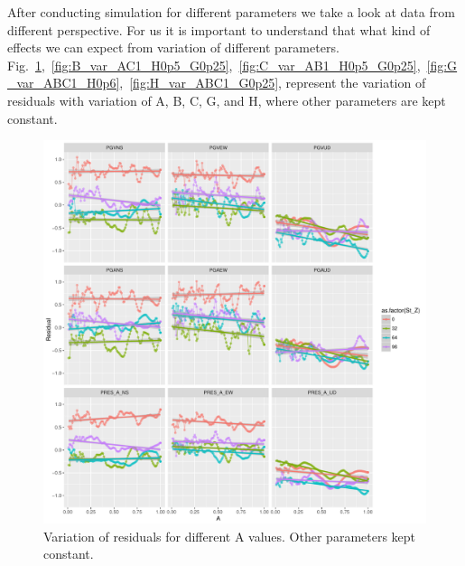 After conducting simulation for different parameters we take a look at data from different perspective. For us it is important to understand that what kind of effects we can expect from variation of different parameters. Fig.~\ref{fig:A_var_BC_1_H0p5_G0p25},~\ref{fig:B_var_AC1_H0p5_G0p25},~\ref{fig:C_var_AB1_H0p5_G0p25},~\ref{fig:G_var_ABC1_H0p6},~\ref{fig:H_var_ABC1_G0p25}, represent the variation of residuals with variation of A, B, C, G, and H, where other parameters are kept constant. 

 \begin{figure}[H]
    \centering
    \includegraphics[width=\textwidth]{figures/pdf/A_var_BC_1_H0p5_G0p25.pdf}
    \caption{Variation of residuals for different A values. Other parameters kept constant.}
    \label{fig:A_var_BC_1_H0p5_G0p25}
\end{figure}

